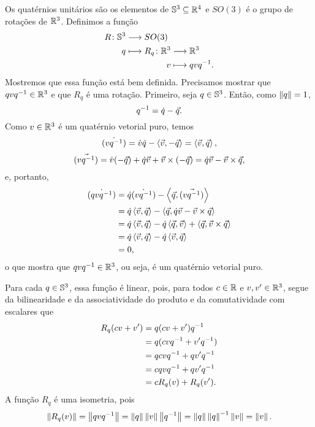 Os quatérnios unitários são os elementos de $\S^3 \subseteq \R^4$ e $SO(3)$ é o grupo de rotações de $\R^3$. Definimos a função
	\begin{align*}
	\func{R}{\S^3}{SO(3)}{q}{
		\begin{aligned}[t]
		\func{R_q}{\R^3}{\R^3}{v}{qvq\inv}.
		\end{aligned}
		}
	\end{align*}
Mostremos que essa função está bem definida. Precisamos mostrar que $qvq\inv \in \R^3$ e que $R_q$ é uma rotação. Primeiro, seja $q \in \S^3$. Então, como $\nor{q}=1$,
	\begin{equation*}
	q\inv = \esc{q}-\vec{q}.
	\end{equation*}
Como $v \in \R^3$ é um quatérnio vetorial puro, temos
	\begin{equation*}
	\esc{(vq\inv)} = \esc{v}\esc{q} - \inte{\vec{v}}{-\vec{q}} = \inte{\vec{v}}{\vec{q}},
	\end{equation*}
	\begin{equation*}
	\vec{(vq\inv)} = \esc{v}(-\vec{q})+\esc{q}\vec{v}+\vec{v} \times (-\vec{q}) = \esc{q}\vec{v}-\vec{v} \times \vec{q},
	\end{equation*}
e, portanto,
	\begin{align*}
	\esc{(qvq\inv)} &= \esc{q}\esc{(vq\inv)} - \inte{\vec{q}}{\vec{(vq\inv)}} \\
		&= \esc{q}\inte{\vec{v}}{\vec{q}} - \inte{\vec{q}}{\esc{q}\vec{v}-\vec{v} \times \vec{q}} \\
		&= \esc{q}\inte{\vec{v}}{\vec{q}}-\esc{q}\inte{\vec{q}}{\vec{v}}+\inte{\vec{q}}{\vec{v} \times \vec{q}} \\
		&= \esc{q}\inte{\vec{v}}{\vec{q}}-\esc{q}\inte{\vec{v}}{\vec{q}} \\
		&= 0,
	\end{align*}
o que mostra que $qvq\inv \in \R^3$, ou seja, é um quatérnio vetorial puro.

Para cada $q \in \S^3$, essa função é linear, pois, para todos $c \in \R$ e $v,v' \in \R^3$, segue da bilinearidade e da associatividade do produto e da comutatividade com escalares que
	\begin{align*}
	R_q(cv+v') &= q(cv+v')q\inv \\
		&= q(cvq\inv+v'q\inv) \\
		&= qcvq\inv + qv'q\inv \\
		&= cqvq\inv + qv'q\inv \\
		&= cR_q(v) + R_q(v').
	\end{align*}
A função $R_q$ é uma isometria, pois
	\begin{equation*}
	\nor{R_q(v)} = \nor{qvq\inv} = \nor{q}\nor{v}\nor{q\inv} = \nor{q}\nor{q}\inv\nor{v} = \nor{v}.
	\end{equation*}


